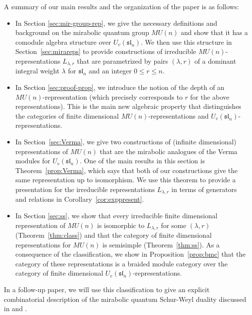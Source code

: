 \documentclass{amsart}
\numberwithin{equation}{section}
\theoremstyle{theorem}
\theoremstyle{definition}
\newcommand{\sll}{\mathfrak{sl}}
\newcommand{\uvsln}{U_v(\sll_n)}
\begin{document}
A summary of our main results and the organization of the paper is as follows:
\begin{itemize}
    \item In Section \ref{sec:mir-group-rep}, we give the necessary definitions and background on the mirabolic quantum group $MU(n)$ and show that it has a comodule algebra structure over $\uvsln$. We then use this structure in Section~\ref{sec:mirareps} to provide constructions of irreducible $MU(n)$-representations $L_{\lambda,r}$ that are parametrized by pairs $(\lambda,r)$ of a dominant integral weight $\lambda$ for $\sll_n$ and an integer $0\leq r\leq n$. %
    \item In Section \ref{sec:proof-prop}, we introduce the notion of the depth of an $MU(n)$-representation (which precisely corresponds to $r$ for the above representations). This is the main new algebraic property that distinguishes the categories of finite dimensional $MU(n)$-representations and $\uvsln$-representations.
    \item In Section~\ref{sec:Verma}, we give two constructions of (infinite dimensional) representations of $MU(n)$ that are the mirabolic analogues of the Verma modules for $\uvsln$. One of the main results in this section is Theorem~\ref{prop:Verma}, which says that both of our constructions give the same representation up to isomorphism. We use this theorem to provide a presentation for the irreducible representations $L_{\lambda, r}$ in terms of generators and relations in Corollary~\ref{cor:exppresent}.
    \item In Section \ref{sec:ss}, we show that every irreducible finite dimensional representation of $MU(n)$ is isomorphic to $L_{\lambda, r}$ for some $(\lambda, r)$ (Theorem~\ref{thm:class}) and that the category of finite dimensional representations for $MU(n)$ is semisimple (Theorem~\ref{thm:ss}). As a consequence of the classification, we show in Proposition~\ref{prop:bmc} that the category of these representations is a braided module category over the category of finite dimensional $\uvsln$-representations.
\end{itemize}

In a follow-up paper, we will use this classification to give an explicit combinatorial description of the mirabolic quantum Schur-Weyl duality discussed in \cite{R15} and \cite{FZM}.
\end{document}
